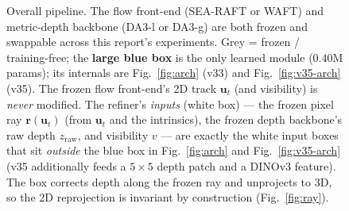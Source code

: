 \documentclass[11pt,a4paper]{article}
\begin{document}
\begin{figure}[h]
\centering
{}
\caption{Overall pipeline. The flow front-end (SEA-RAFT or WAFT) and metric-depth backbone (DA3-l or
DA3-g) are both frozen and swappable across this report's experiments. Grey = frozen / training-free;
the \textbf{large blue box} is the only learned module ($0.40$M params); its internals are
Fig.~\ref{fig:arch} (v33) and Fig.~\ref{fig:v35-arch} (v35). The frozen flow front-end's 2D track
$\mathbf{u}_t$ (and visibility) is \emph{never} modified. The refiner's \emph{inputs} (white box) ---
the frozen pixel ray $\mathbf{r}(\mathbf{u}_t)$ (from $\mathbf{u}_t$ and the intrinsics), the frozen
depth backbone's raw depth $z_{\text{raw}}$, and visibility $v$ --- are exactly the white input boxes
that sit \emph{outside} the blue box in Fig.~\ref{fig:arch} and Fig.~\ref{fig:v35-arch} (v35
additionally feeds a $5{\times}5$ depth patch and a DINOv3 feature). The box corrects depth along the
frozen ray and unprojects to 3D, so the 2D reprojection is invariant by construction
(Fig.~\ref{fig:ray}).}
\label{fig:pipeline}
\end{figure}
\end{document}
